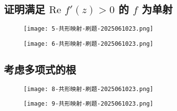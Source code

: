 \subsection{证明满足 \texorpdfstring{$\text{Re }f'(z)>0$}{textRe f'(z)>0} 的 \texorpdfstring{$f$}{f} 为单射}

\begin{exercise}
\begin{figure}[H]
\centering
\texttt{[image: 5-共形映射-刷题-2025061023.png]}
\label{}
\end{figure}
\end{exercise}
\begin{figure}[H]
\centering
\texttt{[image: 6-共形映射-刷题-2025061023.png]}
\label{}
\end{figure}

\subsection{考虑多项式的根}

\begin{exercise}
\begin{figure}[H]
\centering
\texttt{[image: 8-共形映射-刷题-2025061023.png]}
\label{}
\end{figure}
\end{exercise}
\begin{figure}[H]
\centering
\texttt{[image: 9-共形映射-刷题-2025061023.png]}
\label{}
\end{figure}
